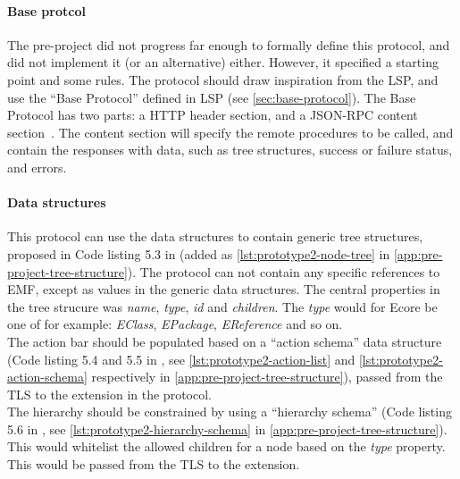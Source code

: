 \paragraph{Base protcol}
The pre-project did not progress far enough to formally define this protocol, and did not implement it (or an alternative) either.
However, it specified a starting point and some rules.
The protocol should draw inspiration from the \acrlong{LSP}, and use the ``Base Protocol'' defined in \acrshort{LSP} (see \cref{sec:base-protocol}).
The Base Protocol has two parts: a HTTP header section, and a \gls{JSON-RPC} content section~\cite[p.~17,18]{rekstadModelingEnvironmentCloud2020}.
The content section will specify the remote procedures to be called, and contain the responses with data, such as tree structures, success or failure status, and errors.


\paragraph{Data structures}
This protocol can use the data structures to contain generic tree structures, proposed in Code listing 5.3 in \cite[p.~43,44]{rekstadModelingEnvironmentCloud2020} (added as \cref{lst:prototype2-node-tree} in \cref{app:pre-project-tree-structure}).
The protocol can not contain any specific references to \acrshort{EMF}, except as values in the generic data structures.
The central properties in the tree strucure was \textit{name}, \textit{type}, \textit{id} and \textit{children}.
The \textit{type} would for \gls{Ecore} be one of for example: \textit{EClass}, \textit{EPackage}, \textit{EReference} and so on.\\

The action bar should be populated based on a ``action schema'' data structure (Code listing 5.4 and 5.5 in \cite[p.~45]{rekstadModelingEnvironmentCloud2020}, see \cref{lst:prototype2-action-list} and \cref{lst:prototype2-action-schema} respectively in \cref{app:pre-project-tree-structure}), passed from the TLS to the extension in the protocol.\\

The hierarchy should be constrained by using a ``hierarchy schema'' (Code listing 5.6 in \cite[p.~45]{rekstadModelingEnvironmentCloud2020}, see \cref{lst:prototype2-hierarchy-schema} in \cref{app:pre-project-tree-structure}).
This would whitelist the allowed children for a node based on the \textit{type} property.
This would be passed from the TLS to the extension.
